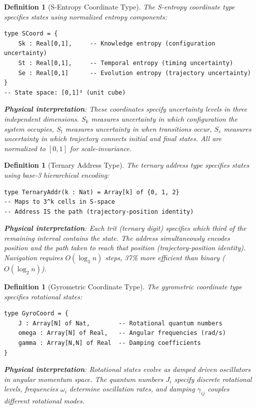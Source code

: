\documentclass[aps,prd,twocolumn,superscriptaddress,floatfix,nofootinbib]{revtex4-2}
\newtheorem{definition}[theorem]{Definition}
\theoremstyle{remark}
\begin{document}
\begin{definition}[S-Entropy Coordinate Type]
\label{def:s_coord_type}
The S-entropy coordinate type specifies states using normalized entropy components:
\begin{verbatim}
type SCoord = {
    Sk : Real[0,1],     -- Knowledge entropy (configuration uncertainty)
    St : Real[0,1],     -- Temporal entropy (timing uncertainty)
    Se : Real[0,1]      -- Evolution entropy (trajectory uncertainty)
}
-- State space: [0,1]³ (unit cube)
\end{verbatim}

\textbf{Physical interpretation}: These coordinates specify uncertainty levels in three independent dimensions. $S_k$ measures uncertainty in which configuration the system occupies, $S_t$ measures uncertainty in when transitions occur, $S_e$ measures uncertainty in which trajectory connects initial and final states. All are normalized to $[0,1]$ for scale-invariance.
\end{definition}

\begin{definition}[Ternary Address Type]
\label{def:ternary_addr_type}
The ternary address type specifies states using base-3 hierarchical encoding:
\begin{verbatim}
type TernaryAddr(k : Nat) = Array[k] of {0, 1, 2}
-- Maps to 3^k cells in S-space
-- Address IS the path (trajectory-position identity)
\end{verbatim}

\textbf{Physical interpretation}: Each trit (ternary digit) specifies which third of the remaining interval contains the state. The address simultaneously encodes position and the path taken to reach that position (trajectory-position identity). Navigation requires $O(\log_3 n)$ steps, 37\% more efficient than binary ($O(\log_2 n)$).
\end{definition}

\begin{definition}[Gyrometric Coordinate Type]
\label{def:gyro_coord_type}
The gyrometric coordinate type specifies rotational states:
\begin{verbatim}
type GyroCoord = {
    J : Array[N] of Nat,        -- Rotational quantum numbers
    omega : Array[N] of Real,   -- Angular frequencies (rad/s)
    gamma : Array[N,N] of Real  -- Damping coefficients
}
\end{verbatim}

\textbf{Physical interpretation}: Rotational states evolve as damped driven oscillators in angular momentum space. The quantum numbers $J_i$ specify discrete rotational levels, frequencies $\omega_i$ determine oscillation rates, and damping $\gamma_{ij}$ couples different rotational modes.
\end{definition}
\end{document}
